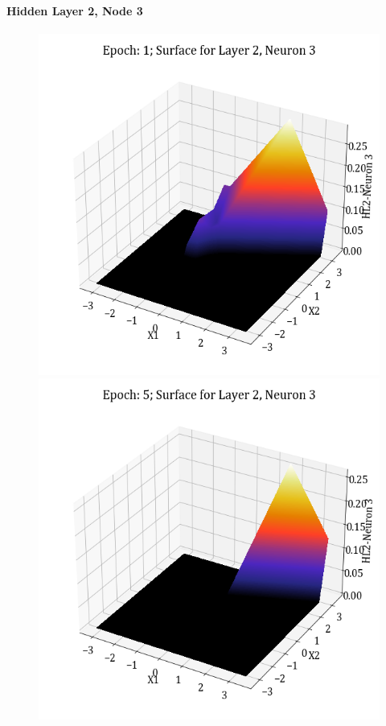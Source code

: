\documentclass[11pt,a4paper]{article}
\begin{document}
\paragraph{Hidden Layer 2, Node 3}
\begin{figure}[H]
    \centering
    \includegraphics[scale=0.4]{images/1B_MLFFNN_E1_HL2_N3.png}
    \includegraphics[scale=0.4]{images/1B_MLFFNN_E5_HL2_N3.png}

\end{figure}
\end{document}
